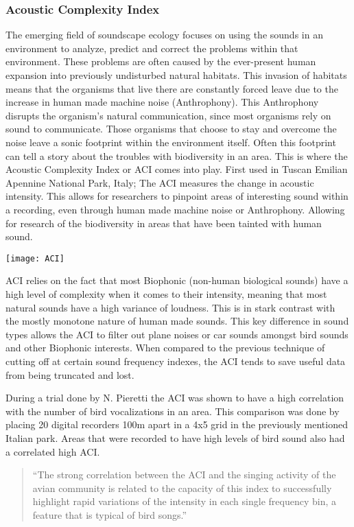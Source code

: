 \subsubsection{Acoustic Complexity Index}
\par The emerging field of soundscape ecology focuses on using the sounds in an environment to analyze, predict and correct the problems within that environment. These problems are often caused by the ever-present human expansion into previously undisturbed natural habitats. This invasion of habitats means that the organisms that live there are constantly forced leave due to the increase in human made machine noise (Anthrophony). This Anthrophony disrupts the organism's natural communication, since most organisms rely on sound to communicate. Those organisms that choose to stay and overcome the noise leave a sonic footprint within the environment itself. Often this footprint can tell a story about the troubles with biodiversity in an area. This is where the Acoustic Complexity Index or ACI comes into play. First used in Tuscan Emilian Apennine National Park, Italy; The ACI measures the change in acoustic intensity. This allows for researchers to pinpoint areas of interesting sound within a recording, even through human made machine noise or Anthrophony. Allowing for research of the biodiversity in areas that have been tainted with human sound.
\begin{center}
  \texttt{[image: ACI]} \\[12pt]
\end{center}
\par ACI relies on the fact that most Biophonic (non-human biological sounds) have a high level of complexity when it comes to their intensity, meaning that most natural sounds have a high variance of loudness. This is in stark contrast with the mostly monotone nature of human made sounds. This key difference in sound types allows the ACI to filter out plane noises or car sounds amongst bird sounds and other Biophonic interests. When compared to the previous technique of cutting off at certain sound frequency indexes, the ACI tends to save useful data from being truncated and lost.
\par During a trial done by N. Pieretti the ACI was shown to have a high correlation with the number of bird vocalizations in an area. This comparison was done by placing 20 digital recorders 100m apart in a 4x5 grid in the previously mentioned Italian park. Areas that were recorded to have high levels of bird sound also had a correlated high ACI.
\begin{quote}
 ``The strong correlation between the ACI and the singing activity of the avian community
  is related to the capacity of this index to successfully highlight rapid variations of the
  intensity in each single frequency bin, a feature that is typical of bird songs.''\cite{pieretti}
\end{quote}

